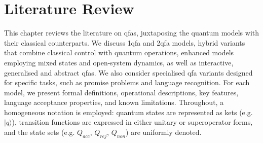 \chapter{Literature Review}
\label{chap:literature-review}

This chapter reviews the literature on \glspl{qfa}, juxtaposing the quantum models with their classical counterparts. We discuss \gls{1qfa} and \gls{2qfa} models, hybrid variants that combine classical control with quantum operations, enhanced models employing mixed states and open-system dynamics, as well as interactive, generalised and abstract \glspl{qfa}. We also consider specialised \gls{qfa} variants designed for specific tasks, such as promise problems and language recognition. 
For each model, we present formal definitions, operational descriptions, key features, language acceptance properties, and known limitations. Throughout, a homogeneous notation is employed: quantum states are represented as kets (e.g. \( |q\rangle \)), transition functions are expressed in either unitary or superoperator forms, and the state sets (e.g. \( Q_{acc} \), \( Q_{rej} \), \( Q_{non} \)) are uniformly denoted.









